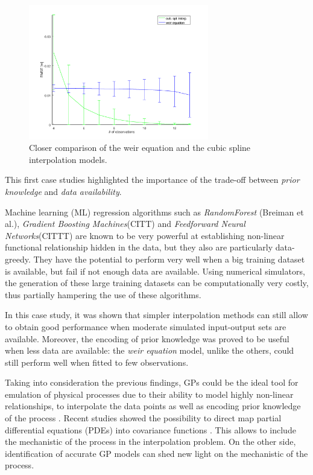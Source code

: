 \begin{figure}[h]
  \centering
  \includegraphics[width=0.7\textwidth]{Figures/fitting_std.png}
  \caption{Closer comparison of the weir equation and the cubic spline interpolation models.}
  \label{fig:fitting_std}
\end{figure}


This first case studies highlighted the importance of the trade-off between \emph{prior knowledge} and \emph{data availability}.

Machine learning (ML) regression algorithms such as \emph{RandomForest} (Breiman et al.), \emph{Gradient Boosting Machines}(CITT) and \emph{Feedforward Neural Networks}(CITTT) are known to be very powerful at establishing non-linear functional relationship hidden in the data, but they also are particularly data-greedy. They have the potential to perform very well when a big training dataset is available, but fail if not enough data are available. Using numerical simulators, the generation of these large training datasets can be computationally very costly, thus partially hampering the use of these algorithms.

In this case study, it was shown that simpler interpolation methods can still allow to obtain good performance when  moderate simulated input-output sets are available. 
Moreover, the encoding of prior knowledge was proved to be useful when less data are available: the \emph{weir equation} model, unlike the others, could still perform well when fitted to few observations.

Taking into consideration the previous findings, GPs could be the ideal tool for emulation of physical processes due to their ability to model highly non-linear relationships, to interpolate the data points as well as encoding prior knowledge of the process \autocite{rasmussen_gaussian_2010}. Recent studies showed the possibility to direct map partial differential equations (PDEs) into covariance functions \autocite{lindgren_an_explicit_2011}. This allows to include the mechanistic of the process in the interpolation problem. On the other side, identification of accurate GP models can shed new light on the mechanistic of the process.

